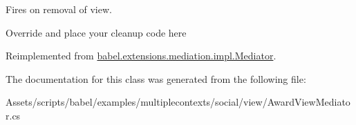 Fires on removal of view. 

Override and place your cleanup code here 

Reimplemented from \hyperlink{classbabel_1_1extensions_1_1mediation_1_1impl_1_1_mediator_a8b818665eda883eac66c83b8468007e9}{babel.\-extensions.\-mediation.\-impl.\-Mediator}.



The documentation for this class was generated from the following file\-:\begin{DoxyCompactItemize}
\item 
Assets/scripts/babel/examples/multiplecontexts/social/view/Award\-View\-Mediator.\-cs\end{DoxyCompactItemize}
